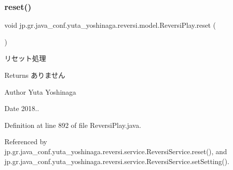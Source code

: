 \subsubsection{\texorpdfstring{reset()}{reset()}}
{\footnotesize\ttfamily void jp.\+gr.\+java\+\_\+conf.\+yuta\+\_\+yoshinaga.\+reversi.\+model.\+Reversi\+Play.\+reset (\begin{DoxyParamCaption}{ }\end{DoxyParamCaption})}



リセット処理 

\begin{DoxyReturn}{Returns}
ありません 
\end{DoxyReturn}
\begin{DoxyAuthor}{Author}
Yuta Yoshinaga 
\end{DoxyAuthor}
\begin{DoxyDate}{Date}
2018.. 
\end{DoxyDate}


Definition at line 892 of file Reversi\+Play.\+java.



Referenced by jp.\+gr.\+java\+\_\+conf.\+yuta\+\_\+yoshinaga.\+reversi.\+service.\+Reversi\+Service.\+reset(), and jp.\+gr.\+java\+\_\+conf.\+yuta\+\_\+yoshinaga.\+reversi.\+service.\+Reversi\+Service.\+set\+Setting().


